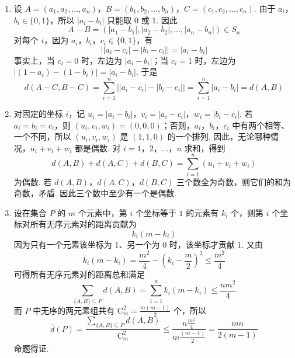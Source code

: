 \begin{solution}
\begin{enumerate}
\item 设 \(A=(a_{1},a_{2},\ldots,a_{n})\)，\(B=(b_{1},b_{2},\ldots,b_{n})\)，\(C=(c_{1},c_{2},\ldots,c_{n})\).
由于 \(a_i\)，\(b_i\in\{0,1\}\)，所以 \(|a_i-b_i|\) 只能取 \(0\) 或 \(1\). 因此
\[
A-B=(|a_{1}-b_{1}|,|a_{2}-b_{2}|,\ldots,|a_{n}-b_{n}|)\in S_n
\]
对每个 \(i\)，因为 \(a_i\)，\(b_i\)，\(c_i\in\{0,1\}\)，有
\[
\left||a_i-c_i|-|b_i-c_i|\right|=|a_i-b_i|
\]
事实上，当 \(c_i=0\) 时，左边为 \(|a_i-b_i|\)；当 \(c_i=1\) 时，左边为 \(|(1-a_i)-(1-b_i)|=|a_i-b_i|\). 于是
\[
d(A-C,B-C)=\sum_{i=1}^{n}\left||a_i-c_i|-|b_i-c_i|\right|=\sum_{i=1}^{n}|a_i-b_i|=d(A,B)
\]

\item 对固定的坐标 \(i\)，记 \(u_i=|a_i-b_i|\)，\(v_i=|a_i-c_i|\)，\(w_i=|b_i-c_i|\).
若 \(a_i=b_i=c_i\)，则 \((u_i,v_i,w_i)=(0,0,0)\)；否则，\(a_i\)，\(b_i\)，\(c_i\) 中有两个相等、一个不同，所以 \((u_i,v_i,w_i)\) 是 \((1,1,0)\) 的一个排列. 因此，无论哪种情况，\(u_i+v_i+w_i\) 都是偶数. 对 \(i=1\)，\(2\)，\(\ldots\)，\(n\) 求和，得到
\[
d(A,B)+d(A,C)+d(B,C)=\sum_{i=1}^{n}(u_i+v_i+w_i)
\]
为偶数. 若 \(d(A,B)\)，\(d(A,C)\)，\(d(B,C)\) 三个数全为奇数，则它们的和为奇数，矛盾. 因此三个数中至少有一个是偶数.

\item 设在集合 \(P\) 的 \(m\) 个元素中，第 \(i\) 个坐标等于 \(1\) 的元素有 \(k_i\) 个，则第 \(i\) 个坐标对所有无序元素对的距离贡献为
\[
k_i(m-k_i)
\]
因为只有一个元素该坐标为 \(1\)、另一个为 \(0\) 时，该坐标才贡献 \(1\). 又由
\[
k_i(m-k_i)=\frac{m^{2}}{4}-\left(k_i-\frac{m}{2}\right)^{2}\leqslant\frac{m^{2}}{4}
\]
可得所有无序元素对的距离总和满足
\[
\sum_{\{A,B\}\subseteq P}d(A,B)=\sum_{i=1}^{n}k_i(m-k_i)\leqslant\frac{nm^{2}}{4}
\]
而 \(P\) 中无序的两元素组共有 \(\mathrm C_m^2=\frac{m(m-1)}{2}\) 个，所以
\[
\overline{d}(P)=\frac{\displaystyle\sum_{\{A,B\}\subseteq P}d(A,B)}{\mathrm C_m^2}
\leqslant\frac{n\frac{m^{2}}{4}}{m\frac{(m-1)}{2}}=\frac{mn}{2(m-1)}
\]
命题得证.
\end{enumerate}
\end{solution}
